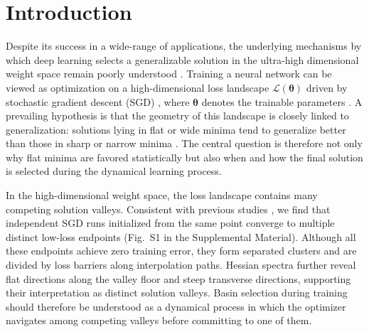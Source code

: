 \documentclass[aps,prx,reprint,superscriptaddress,longbibliography,nofootinbib,floatfix]{revtex4-2}
\begin{document}
\section{Introduction}
Despite its success in a wide-range of applications, the underlying mechanisms by which deep learning selects a generalizable solution in the ultra-high dimensional weight space remain poorly understood \cite{lecunDeepLearning2015,levineMachineLearningMeets2024a}. Training a neural network can be viewed as optimization on a high-dimensional loss landscape $\mathcal{L}(\bm{\theta})$ driven by stochastic gradient descent (SGD) \cite{robbinsStochasticApproximationMethod1951,bottouLargeScaleMachineLearning2010}, where $\bm{\theta}$ denotes the trainable parameters \cite{liuLossLandscapesOptimization2022,sunGlobalLandscapeNeural2020}. A prevailing hypothesis is that the geometry of this landscape is closely linked to generalization: solutions lying in flat or wide minima tend to generalize better than those in sharp or narrow minima \cite{hochreiterFlatMinima1997,liVisualizingLossLandscape2018,jastrzebskiThreeFactorsInfluencing2018,wuHowSGDSelects2018,keskarLargeBatchTrainingDeep2017,chenSimpleConnectionLoss2024,fengActivityWeightDuality2023}. The central question is therefore not only why flat minima are favored statistically but also when and how the final solution is selected during the dynamical learning process. 

In the high-dimensional weight space, the loss landscape contains many competing solution valleys. Consistent with previous studies \cite{choromanskaLossSurfacesMultilayer2015,liVisualizingLossLandscape2018,fortLargeScaleStructure2019,garipovLossSurfacesMode2018,wuHowSGDSelects2018,ghorbaniInvestigationNeuralNet2019,chaudhariEntropySGDBiasingGradient2019}, we find that independent SGD runs initialized from the same point converge to multiple distinct low-loss endpoints (Fig.~S1 in the Supplemental Material). Although all these endpoints achieve zero training error, they form separated clusters and are divided by loss barriers along interpolation paths. Hessian spectra further reveal flat directions along the valley floor and steep transverse directions, supporting their interpretation as distinct solution valleys. Basin selection during training should therefore be understood as a dynamical process in which the optimizer navigates among competing valleys before committing to one of them.
\end{document}
